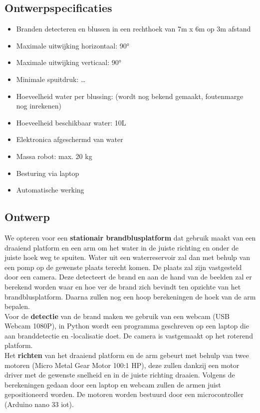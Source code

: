 \documentclass[kulak]{kulakarticle} %
\begin{document}
\subsection{Ontwerpspecificaties}
\begin{itemize}
	\item Branden detecteren en blussen in een rechthoek van 7m x 6m op 3m afstand 
	\item Maximale uitwijking horizontaal: 90°  
	\item Maximale uitwijking verticaal: 90°
	\item Minimale spuitdruk: … %
	\item Hoeveelheid water per blussing: (wordt nog bekend gemaakt, foutenmarge nog inrekenen) 
	\item Hoeveelheid beschikbaar water: 10L 
	\item Elektronica afgeschermd van water 
	\item Massa robot: max. 20 kg
	\item Besturing via laptop
	\item Automatische werking
\end{itemize}

\subsection{Ontwerp}
We opteren voor een \textbf{stationair brandblusplatform} dat gebruik maakt van een draaiend platform en een arm om het water in de juiste richting en onder de juiste hoek weg te spuiten. Water uit een waterreservoir zal dan met behulp van een pomp op de gewenste plaats terecht komen. De plaats zal zijn vastgesteld door een camera. Deze detecteert de brand en aan de hand van de beelden zal er berekend worden waar en hoe ver de brand zich bevindt ten opzichte van het brandblusplatform. Daarna zullen nog een hoop berekeningen de hoek van de arm bepalen. \\

Voor de \textbf{detectie} van de brand maken we gebruik van een webcam (USB Webcam 1080P), in Python wordt een programma geschreven op een laptop die aan branddetectie en -localisatie doet. De camera is vastgemaakt op het roterend platform. \\

Het \textbf{richten} van het draaiend platform en de arm gebeurt met behulp van twee motoren (Micro Metal Gear Motor 100:1 HP), deze zullen dankzij een motor driver met de gewenste snelheid en in de juiste richting draaien. Volgens de berekeningen gedaan door een laptop en webcam zullen de armen juist gepositioneerd worden. De motoren worden bestuurd door een microcontroller (Arduino nano 33 iot). \\
\end{document}
